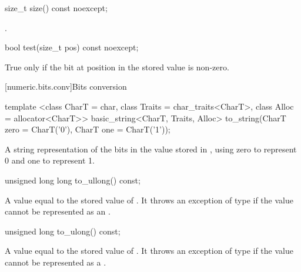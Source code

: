 \begin{addedblock}
\begin{itemdecl}
size_t size() const noexcept;
\end{itemdecl}

\begin{itemdescr}
\returns {}.
\end{itemdescr}

\begin{itemdecl}
bool test(size_t pos) const noexcept;
\end{itemdecl}

\begin{itemdescr}
\returns True only if the bit at position  in the stored value is non-zero.
\end{itemdescr}

[numeric.bits.conv]{Bits conversion}

\begin{itemdecl}
template <class CharT = char, class Traits = char_traits<CharT>, class Alloc = allocator<CharT>>
  basic_string<CharT, Traits, Alloc> to_string(CharT zero = CharT('0'),
                                               CharT one = CharT('1'));
\end{itemdecl}

\begin{itemdescr}
\returns A string representation of the bits in the value stored in , using zero to represent 0 and one to represent 1.
\end{itemdescr}

\begin{itemdecl}
unsigned long long to_ullong() const;
\end{itemdecl}

\begin{itemdescr}
\returns A value equal to the stored value of . It throws an exception of type  if the value cannot be represented as an .
\end{itemdescr}

\begin{itemdecl}
unsigned long to_ulong() const;
\end{itemdecl}

\begin{itemdescr}
\returns A value equal to the stored value of . It throws an exception of type  if the value cannot be represented as a .
\end{itemdescr}


\end{addedblock}
